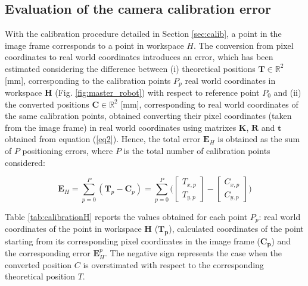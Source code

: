 \documentclass[a4paper, 10 pt, conference]{ieeeconf}      %
\begin{document}
\subsection{Evaluation of the camera calibration error}

With the calibration procedure detailed in Section \ref{sec:calib}, a point in the image frame corresponds to a point in workspace $H$. The conversion from pixel coordinates to real world coordinates introduces an error, which has been estimated considering the difference between (i) theoretical positions $\mathbf{T} \in \mathbb{R}^2$ [mm], corresponding to the calibration points $P_p$ real world coordinates in workspace \textbf{H} (Fig. \ref{fig:master_robot}) with respect to reference point $P_0$ and (ii) the converted positions $\mathbf{C} \in \mathbb{R}^2$ [mm], corresponding to real world coordinates of the same calibration points, obtained converting their pixel coordinates (taken from the image frame) in real world coordinates using matrixes $\mathbf{K}$, $\mathbf{R}$ and $\mathbf{t}$ obtained from equation (\ref{eq2}). Hence, the total error $\mathbf{E}_{H}$ is obtained as the sum of $P$ positioning errors, where $P$ is the total number of calibration points considered:

\begin{equation}
\mathbf{E}_{H} =\sum_{p = 0}^{P} (\mathbf{T}_p - \mathbf{C}_p) = 
\sum_{p = 0}^{P} \bigg( \begin{bmatrix}
T_{x,p}\\
T_{y,p}
\end{bmatrix}-
\begin{bmatrix}
C_{x,p}\\
C_{y,p}
\end{bmatrix} \bigg)
\end{equation}

Table \ref{tab:calibrationH} reports the values obtained for each point $P_p$: real world coordinates of the point in workspace \textbf{H} ($\mathbf{T_p}$), calculated coordinates of the point starting from its corresponding pixel coordinates in the image frame ($\mathbf{C_p}$) and the corresponding error $\mathbf{E}^p_{H}$. The negative sign represents the case when the converted position $C$ is overstimated with respect to the corresponding theoretical position $T$.
\end{document}
